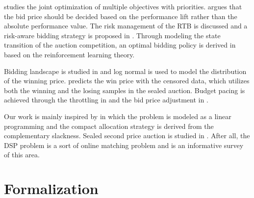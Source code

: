 \documentclass{article}
\begin{document}
\cite{Joint2016} studies the joint optimization of multiple objectives with priorities.
\cite{Lift2016} argues that the bid price should be decided
    based on the performance lift rather than the absolute performance value.
The risk management of the RTB is discussed and a risk-aware bidding strategy is proposed in \cite{Risk2017}.
Through modeling the state transition of the auction competition,
    an optimal bidding policy is derived in \cite{Reinforce2017} based on the reinforcement learning theory.


Bidding landscape is studied in \cite{YingCui2011} and log normal is used to model the distribution of the winning price.
\cite{Wu2015} predicts the win price with the censored data, which utilizes both the winning and the losing samples in the sealed auction.
Budget pacing is achieved through the throttling in \cite{Throttle2015} and the bid price adjustment in \cite{Pacing2013}.

Our work is mainly inspired by \cite{YeChen2011} in which the problem is modeled as a linear programming and
    the compact allocation strategy is derived from the complementary slackness.
Sealed second price auction is studied in \cite{SSPA1961}.
After all, the DSP problem is a sort of online matching problem and \cite{Mehta} is an informative survey of this area.

\section{Formalization} \label{Formalization}
\end{document}
